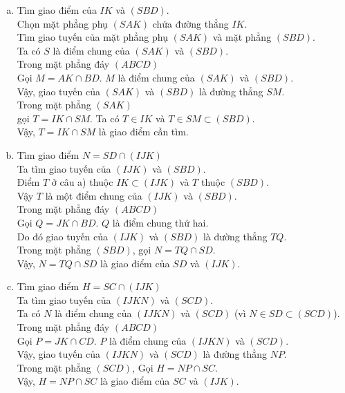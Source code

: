 \begin{ex}
{\begin{center}
		\end{center}
		\begin{enumerate}[a)]
			\item Tìm giao điểm  của $IK$ và $(SBD)$.\\
			Chọn mặt phẳng phụ $(SAK)$  chứa đường thẳng $IK$.\\
			Tìm giao tuyến của mặt phẳng phụ $(SAK)$  và mặt phẳng $(SBD)$.\\
			Ta  có $S$ là điểm chung của $(SAK)$ và $(SBD)$.\\
			Trong mặt  phẳng đáy $(ABCD)$\\
			Gọi $M = AK \cap BD$.  $M$ là điểm chung của $(SAK)$ và $(SBD)$.\\
			Vậy, giao tuyến của $(SAK)$  và $(SBD)$ là đường thẳng $SM$.\\
			Trong mặt  phẳng $(SAK)$\\ gọi $T = IK \cap SM$.
			 Ta có $T \in IK$ và $T \in SM \subset (SBD)$.\\
			Vậy, \textbf{$T = IK \cap SM$} là giao điểm  cần tìm.
			\item {Tìm  giao điểm $N = SD \cap (IJK)$}\\
			Ta tìm giao tuyến của $(IJK)$  và $(SBD)$.\\
			Điểm $T$ ở câu a) thuộc $IK \subset (IJK)$ và $T$ thuộc $(SBD)$.\\ Vậy $T$ là một điểm  chung của $(IJK)$ và $(SBD)$.\\
			 Trong mặt phẳng đáy $(ABCD)$\\
			Gọi $Q = JK \cap BD$.  $Q$ là điểm chung thứ hai.\\
			 Do đó giao tuyến của $(IJK)$ và $(SBD)$ là đường thẳng $TQ$.\\
			Trong mặt phẳng $(SBD)$, gọi $N =  TQ \cap SD$.\\
			Vậy, {$N = TQ \cap SD$} là giao điểm của $SD$ và $(IJK)$.\\ 
			\item {Tìm giao điểm  $H = SC \cap (IJK)$}\\
			Ta tìm giao tuyến của $(IJKN)$ và $(SCD)$.\\ 
			Ta có $N$ là điểm chung của $(IJKN)$ và $(SCD)$ (vì $N \in SD \subset (SCD)$).\\ 
			Trong  mặt phẳng đáy $(ABCD)$\\
			 Gọi $P = JK \cap CD$. $P$ là điểm chung của $(IJKN)$ và $(SCD)$.\\
			Vậy, giao tuyến của $(IJKN)$  và $(SCD)$ là đường thẳng $NP$.\\
			Trong mặt phẳng  $(SCD)$, Gọi $H = NP \cap SC$.\\
			Vậy, {$H = NP \cap SC$} là giao điểm  của $SC$ và $(IJK)$.
		\end{enumerate}
	 }
\end{ex}

